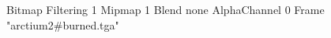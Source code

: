 {Bitmap
	{Filtering 1}
	{Mipmap 1}
	{Blend none}
	{AlphaChannel 0}
	{Frame "arctium2#burned.tga"}
}

